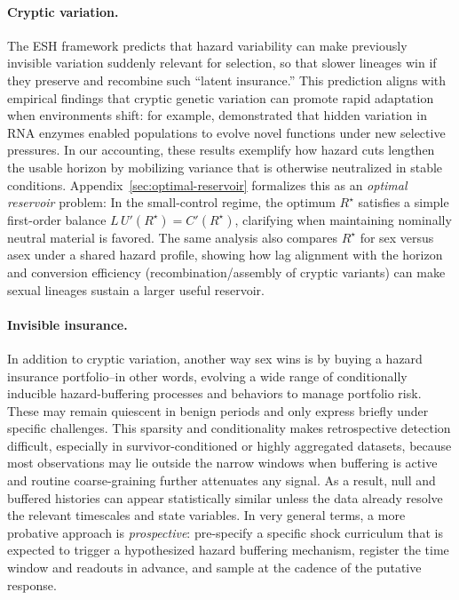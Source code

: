 \documentclass[11pt]{article}
\theoremstyle{upright}
\begin{document}
\paragraph{Cryptic variation.}
The ESH framework predicts that hazard variability can make previously invisible variation suddenly relevant for selection,
so that slower lineages win if they preserve and recombine such “latent insurance.”
This prediction aligns with empirical findings that cryptic genetic variation can promote rapid adaptation when environments shift:
for example, \citet{Hayden2011} demonstrated that hidden variation in RNA enzymes enabled populations to evolve novel functions
under new selective pressures. In our accounting, these results exemplify how hazard cuts lengthen the usable horizon by
mobilizing variance that is otherwise neutralized in stable conditions. Appendix~\ref{sec:optimal-reservoir} formalizes this as 
an \emph{optimal reservoir} problem: In the small-control regime, the optimum $R^\star$ satisfies a simple first-order 
balance $L\,U'(R^\star)=C'(R^\star)$, clarifying when maintaining nominally neutral material is favored. The same analysis also 
compares $R^\star$ for sex versus asex under a shared hazard profile, showing how lag alignment with the horizon and conversion 
efficiency (recombination/assembly of cryptic variants) can make sexual lineages sustain a larger useful reservoir.

\paragraph{Invisible insurance.}
In addition to cryptic variation, another way sex wins is by buying a hazard insurance 
portfolio--in other words, evolving a wide range of conditionally inducible hazard-buffering processes and behaviors to manage portfolio risk. These may 
remain quiescent in benign periods and only express briefly under specific challenges. This sparsity and conditionality makes 
retrospective detection difficult, especially in survivor-conditioned  or highly aggregated datasets, because most observations may lie 
outside the narrow windows when buffering is active and routine coarse-graining further attenuates any signal. As a 
result, null and buffered histories can appear statistically similar unless the data already resolve the relevant timescales 
and state variables. In very general terms, a more probative approach is \emph{prospective}: pre-specify a specific shock 
curriculum that is expected to trigger a hypothesized hazard buffering mechanism, register the time window and readouts 
in advance, and sample at the cadence of the  putative response.
\end{document}
